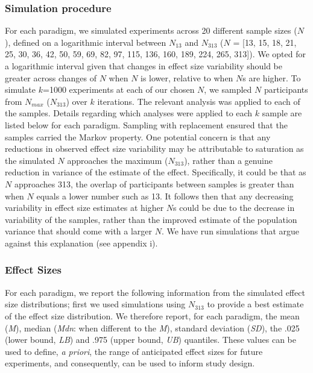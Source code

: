 \documentclass[
  man]{apa6}
\begin{document}
\hypertarget{simulation-procedure}{%
\subsubsection{Simulation procedure}\label{simulation-procedure}}

\label{sec:SamplingProc}

For each paradigm, we simulated experiments across 20 different sample sizes (\(N\)), defined on a logarithmic interval between \(N_{13}\) and \(N_{313}\) (\(N\) = {[}13, 15, 18, 21, 25, 30, 36, 42, 50, 59, 69, 82, 97, 115, 136, 160, 189, 224, 265, 313{]}). We opted for a logarithmic interval given that changes in effect size variability should be greater across changes of \(N\) when \(N\) is lower, relative to when \(N\)s are higher. To simulate \(k\)=1000 experiments at each of our chosen \(N\), we sampled \(N\) participants from \(N_{max}\) (\(N_{313}\)) over \(k\) iterations. The relevant analysis was applied to each of the samples. Details regarding which analyses were applied to each \(k\) sample are listed below for each paradigm. Sampling with replacement ensured that the samples carried the Markov property. One potential concern is that any reductions in observed effect size variability may be attributable to saturation as the simulated \(N\) approaches the maximum (\(N_{313}\)), rather than a genuine reduction in variance of the estimate of the effect. Specifically, it could be that as \(N\) approaches 313, the overlap of participants between samples is greater than when \(N\) equals a lower number such as 13. It follows then that any decreasing variability in effect size estimates at higher \(N\)s could be due to the decrease in variability of the samples, rather than the improved estimate of the population variance that should come with a larger \(N\). We have run simulations that argue against this explanation (see appendix i).

\hypertarget{effect-sizes}{%
\subsubsection{Effect Sizes}\label{effect-sizes}}

For each paradigm, we report the following information from the simulated effect size distributions; first we used simulations using \(N_{313}\) to provide a best estimate of the effect size distribution. We therefore report, for each paradigm, the mean (\emph{M}), median (\emph{Mdn}: when different to the \emph{M}), standard deviation (\emph{SD}), the .025 (lower bound, \emph{LB}) and .975 (upper bound, \emph{UB}) quantiles. These values can be used to define, \emph{a priori}, the range of anticipated effect sizes for future experiments, and consequently, can be used to inform study design.
\end{document}
